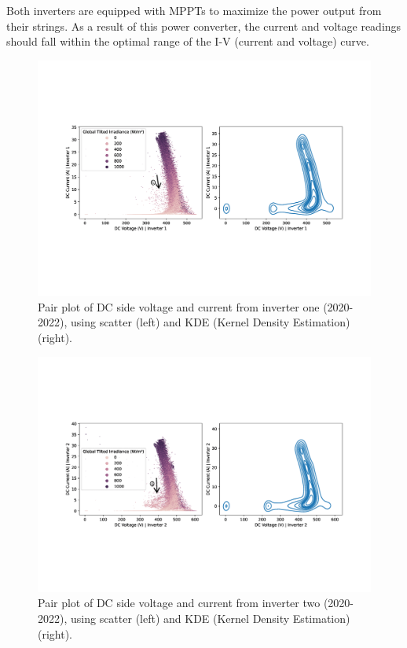 Both inverters are equipped with MPPTs to maximize the power output from their strings. As a result of this power converter, the current and voltage readings should fall within the optimal range of the I-V (current and voltage) curve.

\begin{figure}[h!]
    \centering
    \includegraphics[width=\textwidth,trim={0 5.5cm 0cm 5.5cm},clip]{figures/chapter5/analysis/04_voltage_current_pairplot_kb_1_annotated-1.png}
    \caption{Pair plot of DC side voltage and current from inverter one (2020-2022), using scatter (left) and KDE (Kernel Density Estimation) (right).}
    \label{fig:eda_volt_curr_pair_kb_1}
\end{figure}

\begin{figure}[h!]
    \centering
    \includegraphics[width=\textwidth,trim={0 5.5cm 0cm 5.5cm},clip]{figures/chapter5/analysis/06_voltage_current_pairplot_kb_2_annotated-1.png}
    \caption{Pair plot of DC side voltage and current from inverter two (2020-2022), using scatter (left) and KDE (Kernel Density Estimation) (right).}
    \label{fig:eda_volt_curr_pair_kb_2}
\end{figure}

